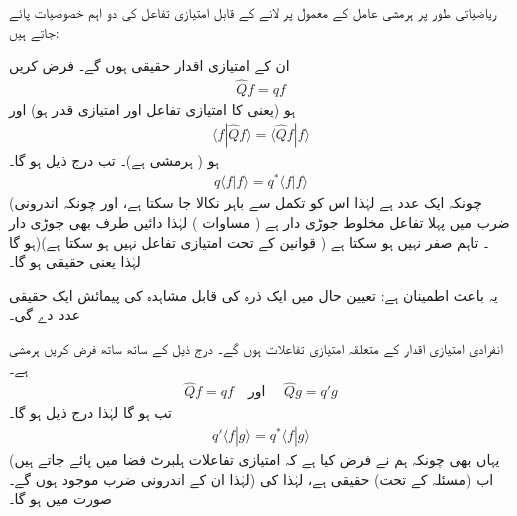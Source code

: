 ریاضیاتی طور پر ہرمشی عامل کے معمول پر لانے کے قابل امتیازی تفاعل کی دو اہم خصوصیات پائے جاتے  ہیں:
  
ان کے امتیازی اقدار حقیقی ہوں گے۔  
 فرض کریں
\begin{align*}
\hat{Q}f = qf 
\end{align*}
ہو (یعنی    کا امتیازی تفاعل     اور  امتیازی قدر  ہو)       اور 
\begin{align*}
\langle f | \hat{Q}  f \rangle = \langle \hat{Q} f | f  \rangle
\end{align*}
ہو ( ہرمشی ہے)۔  تب درج ذیل ہو گا۔
\begin{align*}
q\langle f \left\vert f \right.  \rangle = q^{*} \langle f \left\vert f \right. \rangle
\end{align*}
(چونکہ  ایک عدد ہے  لہٰذا  اس کو  تکمل سے باہر نکالا   جا سکتا ہے،   اور چونکہ اندرونی ضرب میں پہلا تفاعل مخلوط جوڑی دار ہے ( مساوات  )   لہٰذا  دائیں طرف   بھی جوڑی دار ہو گا)۔ تاہم    صفر نہیں ہو سکتا ہے (  قوانین کے تحت  امتیازی تفاعل نہیں ہو سکتا ہے) لہٰذا    یعنی   حقیقی ہو گا۔

  یہ باعث اطمینان ہے:   تعیین حال میں ایک ذرہ کی  قابل مشاہدہ  کی پیمائش ایک حقیقی عدد دے گی۔ 
   
انفرادی امتیازی اقدار کے متعلقہ امتیازی تفاعلات  ہوں گے۔  
درج ذیل کے ساتھ ساتھ  فرض کریں     ہرمشی ہے۔
\begin{align*}
\hat{Q}f = qf  \quad \text{اور }\quad  \hat{Q}g=q'g
\end{align*}
  تب  ہو گا  لہٰذا  درج ذیل ہو گا۔
\begin{align*}
q' \langle f | g \rangle = q^{*} \langle f | g \rangle
\end{align*}
(یہاں بھی چونکہ ہم نے فرض کیا ہے کہ امتیازی تفاعلات   ہلبرٹ فضا  میں پائے جاتے ہیں لہٰذا  ان کے  اندرونی ضرب موجود ہوں  گے۔)   اب (مسئلہ  کے تحت)   حقیقی ہے،    لہٰذا    کی صورت میں    ہو گا۔  

